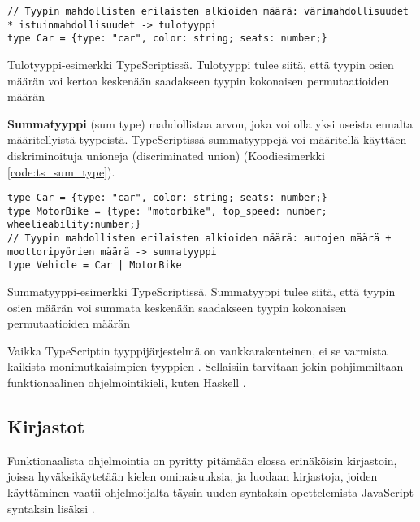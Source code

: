 \begin{code}
    \begin{verbatim}
// Tyypin mahdollisten erilaisten alkioiden määrä: värimahdollisuudet * istuinmahdollisuudet -> tulotyyppi
type Car = {type: "car", color: string; seats: number;}
\end{verbatim}
    \caption{Tulotyyppi-esimerkki TypeScriptissä. Tulotyyppi tulee siitä, että tyypin osien määrän voi kertoa keskenään saadakseen tyypin kokonaisen permutaatioiden määrän}
    \label{code:ts_product_type}
\end{code}

\textbf{Summatyyppi} (sum type) mahdollistaa arvon, joka voi olla yksi useista ennalta määritellyistä tyypeistä. TypeScriptissä summatyyppejä voi määritellä käyttäen diskriminoituja unioneja (discriminated union) (Koodiesimerkki \ref{code:ts_sum_type}). \citep{algebraic_data_types,holvikari2021category}

\begin{code}
    \begin{verbatim}
type Car = {type: "car", color: string; seats: number;}
type MotorBike = {type: "motorbike", top_speed: number; wheelieability:number;}
// Tyypin mahdollisten erilaisten alkioiden määrä: autojen määrä + moottoripyörien määrä -> summatyyppi
type Vehicle = Car | MotorBike
\end{verbatim}
    \caption{Summatyyppi-esimerkki TypeScriptissä. Summatyyppi tulee siitä, että tyypin osien määrän voi summata keskenään saadakseen tyypin kokonaisen permutaatioiden määrän}
    \label{code:ts_sum_type}
\end{code}


Vaikka TypeScriptin tyyppijärjestelmä on vankkarakenteinen, ei se varmista kaikista monimutkaisimpien tyyppien  \cite{holvikari2021category}. Sellaisiin tarvitaan jokin pohjimmiltaan funktionaalinen ohjelmointikieli, kuten Haskell \cite{holvikari2021category}.

\subsection{Kirjastot}

Funktionaalista ohjelmointia on pyritty pitämään elossa erinäköisin kirjastoin, joissa hyväksikäytetään kielen ominaisuuksia, ja luodaan kirjastoja, joiden käyttäminen vaatii ohjelmoijalta täysin uuden syntaksin opettelemista JavaScript syntaksin lisäksi \cite{ramda,sanctuary,crocks,fpts,holvikari2021category}.

